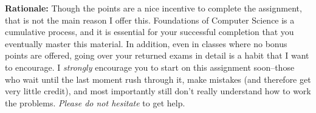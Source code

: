 \documentclass{article}
\begin{document}
\vspace{0.2in}

\noindent\textbf{Rationale:}  Though the points are a nice incentive to complete the assignment, that is not the main reason I offer this.  Foundations of Computer Science is a cumulative process, and it is essential for your successful completion that you eventually master this material.  In addition, even in classes where no bonus points are offered, going over your returned exams in detail is a habit that I want to encourage.  I \emph{strongly} encourage you to start on this assignment soon--those who wait until the last moment rush through it, make mistakes (and therefore get very little credit), and most importantly still don't really understand how to work the problems.  \emph{Please do not hesitate} to get help.
\end{document}
